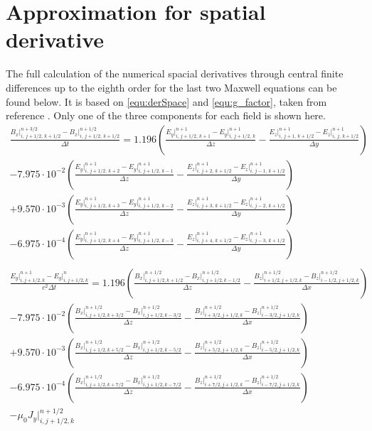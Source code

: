 \documentclass[bachelor_thesis]{subfiles}
\begin{document}
\appendix
\chapter{Approximation for spatial derivative} \label{chap:numMaxwell}

The full calculation of the numerical spacial derivatives through central finite differences up to the eighth order for the last two Maxwell equations can be found below.
It is based on \autoref{equ:derSpace} and  \autoref{equ:g_factor}, taken from reference \cite{PICRepo}.
Only one of the three components for each field is shown here.
\begin{align*}
\frac{{B}_x\rvert_{i,\, j+1/2,\, k+1/2}^{n+3/2} - {B}_x\rvert_{i,\, j+1/2,\, k+1/2}^{n+1/2}}{\Delta t}
	= 1.196 \left(\frac{{E}_y\rvert_{i,\, j+1/2,\, k+1}^{n+1} - {E}_y\rvert_{i,\, j+1/2,\, k}^{n+1}}{\Delta z}
	- \frac{{E}_z\rvert_{i,\, j+1,\, k+1/2}^{n+1} - {E}_z\rvert_{i,\, j,\, k+1/2}^{n+1}}{\Delta y}\right)			\\
	- 7.975\cdot 10^{-2} \left(\frac{{E}_y\rvert_{i,\, j+1/2,\, k+2}^{n+1} - {E}_y\rvert_{i,\, j+1/2,\, k-1}^{n+1}}{\Delta z}
	- \frac{{E}_z\rvert_{i,\, j+2,\, k+1/2}^{n+1} - {E}_z\rvert_{i,\, j-1,\, k+1/2}^{n+1}}{\Delta y}\right)			\\
	+ 9.570\cdot 10^{-3} \left(\frac{{E}_y\rvert_{i,\, j+1/2,\, k+3}^{n+1} - {E}_y\rvert_{i,\, j+1/2,\, k-2}^{n+1}}{\Delta z}
	- \frac{{E}_z\rvert_{i,\, j+3,\, k+1/2}^{n+1} - {E}_z\rvert_{i,\, j-2,\, k+1/2}^{n+1}}{\Delta y}\right)			\\
	- 6.975\cdot 10^{-4} \left(\frac{{E}_y\rvert_{i,\, j+1/2,\, k+4}^{n+1} - {E}_y\rvert_{i,\, j+1/2,\, k-3}^{n+1}}{\Delta z}
	- \frac{{E}_z\rvert_{i,\, j+4,\, k+1/2}^{n+1} - {E}_z\rvert_{i,\, j-3,\, k+1/2}^{n+1}}{\Delta y}\right)			\\ \\
\frac{E_y\rvert_{i, j+1/2, k}^{n+1} - E_y\rvert_{i, j+1/2, k}^{n}}{c^2 \Delta t} 
	= 1.196 \left(\frac{B_x\rvert_{i, j+1/2, k+1/2}^{n+1/2} - B_x\rvert_{i, j+1/2, k-1/2}^{n+1/2}}{\Delta z}
	 - \frac{B_z\rvert_{i+1/2, j+1/2, k}^{n+1/2} - B_z\rvert_{i-1/2, j+1/2, k}^{n+1/2}}{\Delta x}\right)			\\
 	- 7.975\cdot 10^{-2} \left(\frac{B_x\rvert_{i, j+1/2, k+3/2}^{n+1/2} - B_x\rvert_{i, j+1/2, k-3/2}^{n+1/2}}{\Delta z}
 	 -\frac{B_z\rvert_{i+3/2, j+1/2, k}^{n+1/2} - B_z\rvert_{i-3/2, j+1/2, k}^{n+1/2}}{\Delta x}\right)			\\
 	+ 9.570\cdot 10^{-3} \left(\frac{B_x\rvert_{i, j+1/2, k+5/2}^{n+1/2} - B_x\rvert_{i, j+1/2, k-5/2}^{n+1/2}}{\Delta z}
 	- \frac{B_z\rvert_{i+5/2, j+1/2, k}^{n+1/2} - B_z\rvert_{i-5/2, j+1/2, k}^{n+1/2}}{\Delta x}\right)			\\
 	- 6.975\cdot 10^{-4} \left(\frac{B_x\rvert_{i, j+1/2, k+7/2}^{n+1/2} - B_x\rvert_{i, j+1/2, k-7/2}^{n+1/2}}{\Delta z}
	-\frac{B_z\rvert_{i+7/2, j+1/2, k}^{n+1/2} - B_z\rvert_{i-7/2, j+1/2, k}^{n+1/2}}{\Delta x}\right)			\\
 	- \mu_0 J_y\rvert_{i, j+1/2, k}^{n+1/2}
\end{align*}
\end{document}
